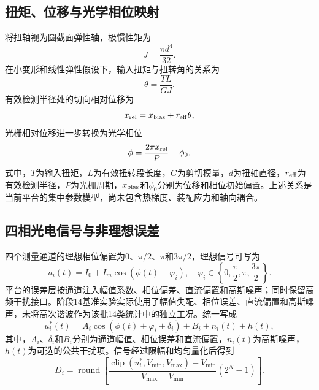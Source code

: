 \documentclass[UTF8,a4paper,12pt]{ctexart}
\begin{document}
\subsection{扭矩、位移与光学相位映射}

将扭轴视为圆截面弹性轴，极惯性矩为
\begin{equation}
  J=\frac{\pi d^4}{32}.
  \label{eq:polar}
\end{equation}
在小变形和线性弹性假设下，输入扭矩与扭转角的关系为
\begin{equation}
  \theta=\frac{TL}{GJ}.
  \label{eq:torsion}
\end{equation}
有效检测半径处的切向相对位移为
\begin{equation}
  x_{\rm rel}=x_{\rm bias}+r_{\rm eff}\theta,
  \label{eq:displacement}
\end{equation}
光栅相对位移进一步转换为光学相位
\begin{equation}
  \phi=\frac{2\pi x_{\rm rel}}{P}+\phi_0.
  \label{eq:phase}
\end{equation}
式中，$T$为输入扭矩，$L$为有效扭转段长度，$G$为剪切模量，$d$为扭轴直径，$r_{\rm eff}$为有效检测半径，$P$为光栅周期，$x_{\rm bias}$和$\phi_0$分别为位移和相位初始偏置。上述关系是当前平台的集中参数模型，尚未包含热梯度、装配应力和轴向耦合。

\subsection{四相光电信号与非理想误差}

四个测量通道的理想相位偏置为$0$、$\pi/2$、$\pi$和$3\pi/2$，理想信号可写为
\begin{equation}
  u_i(t)=I_0+I_m\cos\left(\phi(t)+\varphi_i\right),\quad
  \varphi_i\in\left\{0,\frac{\pi}{2},\pi,\frac{3\pi}{2}\right\}.
  \label{eq:fourphase}
\end{equation}
平台的误差层按通道注入幅值系数、相位偏差、直流偏置和高斯噪声；同时保留高频干扰接口。阶段14基准实验实际使用了幅值失配、相位误差、直流偏置和高斯噪声，未将高次谐波作为该批14类统计中的独立工况。统一写成
\begin{equation}
  u_i^*(t)=A_i\cos\left(\phi(t)+\varphi_i+\delta_i\right)+B_i+n_i(t)+h(t),
  \label{eq:error}
\end{equation}
其中，$A_i$、$\delta_i$和$B_i$分别为通道幅值、相位误差和直流偏置，$n_i(t)$为高斯噪声，$h(t)$为可选的公共干扰项。信号经过限幅和均匀量化后得到
\begin{equation}
  D_i=\operatorname{round}\left[\frac{\operatorname{clip}(u_i^*,V_{\min},V_{\max})-V_{\min}}{V_{\max}-V_{\min}}(2^N-1)\right].
  \label{eq:adc}
\end{equation}
\end{document}
